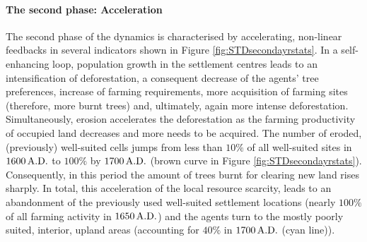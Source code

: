 \paragraph{The second phase: Acceleration}
The second phase of the dynamics is characterised by accelerating, non-linear feedbacks in several indicators shown in Figure \ref{fig:STDsecondayrstats}.
In a self-enhancing loop, population growth in the settlement centres leads to an intensification of deforestation, a consequent decrease of the agents' tree preferences, increase of farming requirements, more acquisition of farming sites (therefore, more burnt trees) and, ultimately, again more intense deforestation.
Simultaneously, erosion accelerates the deforestation as the farming productivity of occupied land decreases and  more needs to be acquired.
The number of eroded, (previously) well-suited cells jumps from less than $10\%$ of all well-suited sites in $1600\,{\rm A.D.}$ to $100\%$ by $1700\, {\rm A.D.}$ (brown curve in Figure \ref{fig:STDsecondayrstats}).
Consequently, in this period the amount of trees burnt for clearing new land rises sharply. %
In total, this acceleration of the local resource scarcity, leads to an abandonment of the previously used well-suited settlement locations (nearly $100\%$ of all farming activity in $1650\,{\rm A.D.}$) and the agents turn to the mostly poorly suited, interior, upland areas (accounting for $40\%$ in $1700\,{\rm A.D.}$ (cyan line)).

